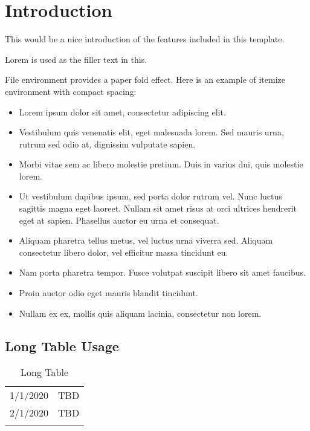 \chapter{Introduction}
This would be a nice introduction of the features included in this \gls{template}.

\gls{Lorem} is used as the filler text in this.




\begin{file}
	File environment provides a paper fold effect. 
	Here is an example of itemize environment with compact spacing:
	 
\begin{itemize}
	\item 	Lorem ipsum dolor sit amet, consectetur adipiscing elit. 
	\item 	Vestibulum quis venenatis elit, eget malesuada lorem. Sed mauris urna, rutrum sed odio at, dignissim vulputate sapien. 
	\item 	Morbi vitae sem ac libero molestie pretium. Duis in varius dui, quis molestie lorem. 
	\item 	Ut vestibulum dapibus ipsum, sed porta dolor rutrum vel. Nunc luctus sagittis magna eget laoreet. Nullam sit amet risus at orci ultrices hendrerit eget at sapien. Phasellus auctor eu urna et consequat. 
	\item 	Aliquam pharetra tellus metus, vel luctus urna viverra sed. Aliquam consectetur libero dolor, vel efficitur massa tincidunt eu. 
	\item 	Nam porta pharetra tempor. Fusce volutpat suscipit libero sit amet faucibus. 
	\item Proin auctor odio eget mauris blandit tincidunt. 
	\item Nullam ex ex, mollis quis aliquam lacinia, consectetur non lorem. 
\end{itemize}
\end{file}

\section{Long Table Usage}

\begin{longtable}{p{}p{}}
	\toprule
	1/1/2020 & TBD \\
	2/1/2020 & TBD \\
	\bottomrule
	\caption{Long Table}
\end{longtable}


